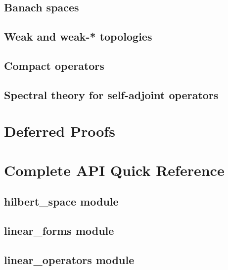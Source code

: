 \documentclass[11pt,twoside,openright]{book}
\theoremstyle{plain}
\theoremstyle{definition}
\theoremstyle{remark}
\begin{document}
\section{Banach spaces}
\label{sec:banach-spaces}

\section{Weak and weak-* topologies}
\label{sec:weak-topologies}

\section{Compact operators}
\label{sec:compact-operators}

\section{Spectral theory for self-adjoint operators}
\label{sec:spectral-theory}


\chapter{Deferred Proofs}
\label{app:proofs}


\chapter{Complete API Quick Reference}
\label{app:api-reference}

\section{hilbert\_space module}
\label{sec:api-hilbert}

\section{linear\_forms module}
\label{sec:api-forms}

\section{linear\_operators module}
\label{sec:api-operators}
\end{document}
